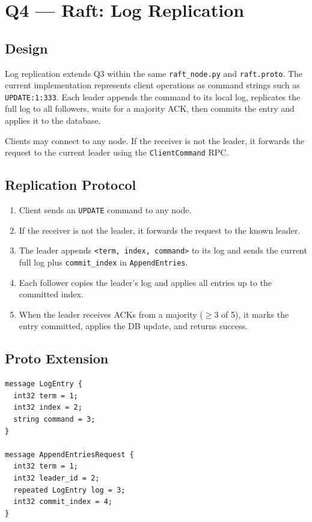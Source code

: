 \section{Q4 — Raft: Log Replication}

\subsection*{Design}

Log replication extends Q3 within the same \texttt{raft\_node.py} and
\texttt{raft.proto}. The current implementation represents client operations
as command strings such as \texttt{UPDATE:1:333}. Each leader appends the
command to its local log, replicates the full log to all followers, waits for a
majority ACK, then commits the entry and applies it to the database.

Clients may connect to any node. If the receiver is not the leader, it forwards
the request to the current leader using the \texttt{ClientCommand} RPC.

\subsection*{Replication Protocol}

\begin{enumerate}
  \item Client sends an \texttt{UPDATE} command to any node.
  \item If the receiver is not the leader, it forwards the request to the known leader.
  \item The leader appends \texttt{<term, index, command>} to its log and sends
        the current full log plus \texttt{commit\_index} in \texttt{AppendEntries}.
  \item Each follower copies the leader's log and applies all entries up to the
        committed index.
  \item When the leader receives ACKs from a majority ($\geq 3$ of 5), it marks
        the entry committed, applies the DB update, and returns success.
\end{enumerate}

\subsection*{Proto Extension}

\begin{lstlisting}[language={}]
message LogEntry {
  int32 term = 1;
  int32 index = 2;
  string command = 3;
}

message AppendEntriesRequest {
  int32 term = 1;
  int32 leader_id = 2;
  repeated LogEntry log = 3;
  int32 commit_index = 4;
}
\end{lstlisting}

